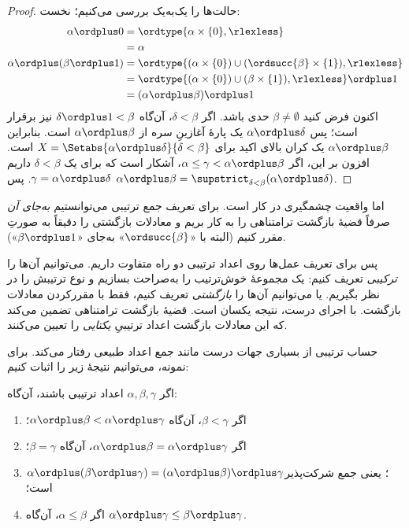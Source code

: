 \documentclass[../../../include/open-logic-section]{subfiles}
\begin{document}
\begin{proof}
حالت‌ها را یک‌به‌یک بررسی می‌کنیم؛ نخست:
\begin{align*}
	\alpha \ordplus  0
	&= \ordtype{\alpha \times \{0\}, \rlexless}\\
	&= \alpha\\
	\alpha \ordplus (\beta \ordplus  1)
	&= \ordtype{(\alpha\times \{0\}) \cup (\ordsucc{\beta}\times \{1\}), \rlexless} \\
	&= \ordtype{(\alpha\times \{0\}) \cup (\beta \times \{1\}), \rlexless} \ordplus 1\\
	&= (\alpha \ordplus  \beta) \ordplus  1
\end{align*}
اکنون فرض کنید $\beta \neq \emptyset$ حدی باشد. اگر
$\delta < \beta$، آن‌گاه $\delta\ordplus 1 < \beta$ نیز برقرار است؛
پس $\alpha \ordplus \delta$ یک پارهٔ آغازینِ سره از
$\alpha \ordplus \beta$ است. بنابراین $\alpha \ordplus \beta$ یک
کران بالای اکید برای
$X = \Setabs{\alpha \ordplus \delta}{\delta < \beta}$ است. افزون بر
این، اگر $\alpha \leq \gamma < \alpha \ordplus \beta$، آشکار است که
برای یک $\delta < \beta$ داریم
$\gamma = \alpha \ordplus \delta$. پس
$\alpha \ordplus \beta =
\supstrict_{\delta< \beta}(\alpha\ordplus \delta)$.
\end{proof}

اما واقعیت چشمگیری در کار است. برای تعریف جمع ترتیبی می‌توانستیم
\emph{به‌جای آن} صرفاً قضیهٔ بازگشت ترامتناهی را به کار بریم و
معادلات بازگشتی را دقیقاً به صورتِ
 مقرر کنیم (البته با
«$\ordsucc{\beta}$» به‌جای «$\beta \ordplus 1$»).

پس برای تعریف عمل‌ها روی اعداد ترتیبی دو راه متفاوت داریم. می‌توانیم
آن‌ها را \emph{ترکیبی} تعریف کنیم: یک مجموعهٔ خوش‌ترتیب را به‌صراحت
بسازیم و نوع ترتیبش را در نظر بگیریم. یا می‌توانیم آن‌ها را
\emph{بازگشتی} تعریف کنیم، فقط با مقررکردن معادلات بازگشت. با اجرای
درست، نتیجه یکسان است. قضیهٔ بازگشت ترامتناهی تضمین می‌کند که این
معادلات بازگشت اعداد ترتیبیِ \emph{یکتایی} را تعیین می‌کنند.

حساب ترتیبی از بسیاری جهات درست مانند جمع اعداد طبیعی رفتار می‌کند.
برای نمونه، می‌توانیم نتیجهٔ زیر را اثبات کنیم:

\begin{lem}
اگر $\alpha, \beta, \gamma$ اعداد ترتیبی باشند، آن‌گاه:
\begin{enumerate}
	\item{} اگر $\beta < \gamma$، آن‌گاه
	$\alpha \ordplus \beta < \alpha \ordplus \gamma$؛
	\item{} اگر
	$\alpha \ordplus \beta = \alpha\ordplus \gamma$، آن‌گاه
	$\beta = \gamma$؛
	\item{}
	$\alpha \ordplus (\beta \ordplus \gamma) =
	(\alpha \ordplus \beta) \ordplus \gamma$؛ یعنی جمع شرکت‌پذیر است؛
	\item{} اگر $\alpha \leq \beta$، آن‌گاه
	$\alpha \ordplus \gamma \leq \beta \ordplus \gamma$.
\end{enumerate}
\end{lem}
\end{document}
